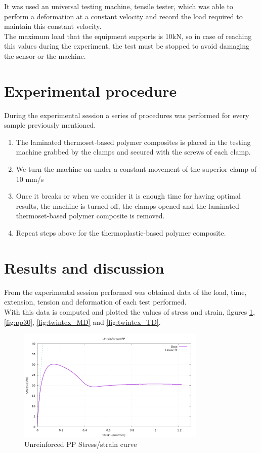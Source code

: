 It was used an universal testing machine, tensile tester, which was able to perform
a deformation at a constant velocity and record the load required to maintain this
constant velocity.\\

The maximum load that the equipment supports is 10kN, so in case of reaching this
values during the experiment, the test must be stopped to avoid damaging the sensor
or the machine.\\


\section{Experimental procedure}

During the experimental session a series of procedures was performed for every
sample previously mentioned.\\

\begin{enumerate}
	\item The laminated thermoset-based polymer composites is placed in the
	testing machine grabbed by the clamps and secured with the screws of each clamp.
	\item We turn the machine on under a constant movement of the superior
	clamp of 10 mm/s
	\item Once it breaks or when we consider it is enough time for having
	optimal results, the machine is turned off, the clamps opened and the
	laminated thermoset-based polymer composite is removed.
	\item Repeat steps above for the thermoplastic-based polymer composite.
\end{enumerate}

\section{Results and discussion}

From the experimental session performed was obtained data of the load, time, extension, tension and deformation of each test performed.\\
With this data is computed and plotted the values of stress and strain, figures
\ref{fig:upp}, \ref{fig:pp30}, \ref{fig:twintex_MD} and \ref{fig:twintex_TD}.\\

\begin{figure}[H]
	\centering
	\includegraphics[width=0.8\textwidth]{img/UPP.png}
	\caption{Unreinforced PP Stress/strain curve}
	\label{fig:upp}
\end{figure}

